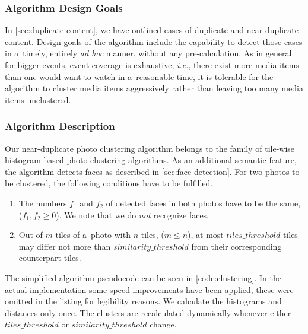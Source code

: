 \subsubsection{Algorithm Design Goals}

In \autoref{sec:duplicate-content}, we have outlined
cases of duplicate and near-duplicate content.
Design goals of the algorithm include
the capability to detect those cases
in a~timely, entirely \emph{ad hoc} manner, without any pre-calculation.
As in general for bigger events, event coverage is exhaustive, \emph{i.e.},
there exist more media items
than one would want to watch in a~reasonable time,
it is tolerable for the algorithm to cluster media items aggressively
rather than leaving too many media items unclustered.

\subsubsection{Algorithm Description}

Our near-duplicate photo clustering algorithm belongs to the family of
tile-wise histogram-based photo clustering algorithms.
As an additional semantic feature, the algorithm detects faces
as described in \autoref{sec:face-detection}.
For two photos to be clustered,
the following conditions have to be fulfilled.

\begin{enumerate}
  \item The numbers $f_1$ and $f_2$ of detected faces in both photos
    have to be the same, ($f_1, f_2 \geq 0$).
    We note that we do \emph{not} recognize faces.
  \item Out of $m$ tiles of a~photo with $n$ tiles, ($m \leq n$),
    at most $tiles\_threshold$ tiles may differ not more than $similarity\_threshold$
    from their corresponding counterpart tiles.
\end{enumerate}

The simplified algorithm pseudocode can be seen in \autoref{code:clustering}.
In the actual implementation some speed improvements have been applied,
these were omitted in the listing for legibility reasons.
We calculate the histograms and distances only once.
The clusters are recalculated dynamically
whenever either $tiles\_threshold$ or $similarity\_threshold$ change.

